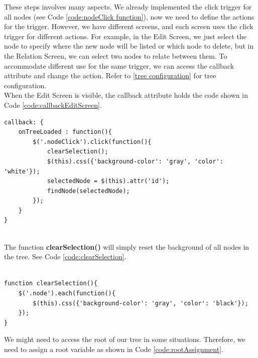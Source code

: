 \documentclass[11pt]{article} %
\begin{document}
\noindent
These steps involves many aspects. We already implemented the click trigger for all nodes (see Code \ref{code:nodeClick function}), now we need to define the actions for the trigger. However, we have different screens, and each screen uses the click trigger for different actions. For example, in the Edit Screen, we just select the node to specify where the new node will be listed or which node to delete, but in the Relation Screen, we can select two nodes to relate between them.
To accommodate different use for the same trigger, we can access the callback attribute and change the action. Refer to \ref{tree configuration} for tree configuration.\\

\noindent
When the Edit Screen is visible, the callback attribute holds the code shown in Code \ref{code:callbackEditScreen}.

\noindent
\begin{minipage}[c]{\linewidth}
\begin{lstlisting}[basicstyle=\scriptsize, tabsize=4, frame=single, caption=callback code for Edit Screen, label=code:callbackEditScreen]
callback: {
	onTreeLoaded : function(){
		$('.nodeClick').click(function(){
			clearSelection();
			$(this).css({'background-color': 'gray', 'color': 'white'});
			selectedNode = $(this).attr('id');
			findNode(selectedNode);
		});
	}
}


\end{lstlisting}
\end{minipage}

\noindent
The function \textbf{clearSelection()} will simply reset the background of all nodes in the tree. See Code \ref{code:clearSelection}.

\noindent
\begin{minipage}[c]{\linewidth}
\begin{lstlisting}[basicstyle=\scriptsize, tabsize=4, frame=single, caption=clearSelection Function, label=code:clearSelection]

function clearSelection(){
	$('.node').each(function(){
		$(this).css({'background-color': 'gray', 'color': 'black'}); 
	});
}

\end{lstlisting}
\end{minipage}

\noindent


\noindent
We might need to access the root of our tree in some situations. Therefore, we need to assign a root variable as shown in Code \ref{code:rootAssignment}.
\end{document}
